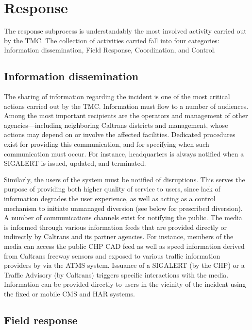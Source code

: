 \documentclass[12pt]{report}
\begin{document}
\section{Response}
\label{sec:response}

The response subprocess is understandably the most involved activity carried out
by the TMC.  The collection of activities carried fall into four categories:
Information dissemination, Field Response, Coordination, and Control.

\subsection{Information dissemination}
\label{sec:inf-dis}

The sharing of information regarding the incident is one of the most critical
actions carried out by the TMC.  Information must flow to a number of audiences.
Among the most important recipients are the operators and management of other
agencies---including neighboring Caltrans districts and management, whose
actions may depend on or involve the affected facilities.  Dedicated procedures
exist for providing this communication, and for specifying when such
communication must occur.  For instance, headquarters is always notified when a
SIGALERT is issued, updated, and terminated.

Similarly, the users of the system must be notified of disruptions.  This serves
the purpose of providing both higher quality of service to users, since lack of
information degrades the user experience, as well as acting as a control
mechanism to initiate unmanaged diversion (see below for prescribed diversion).
A number of communications channels exist for notifying the public.  The media
is informed through various information feeds that are provided directly or
indirectly by Caltrans and its partner agencies.  For instance, members of the
media can access the public CHP CAD feed as well as speed information derived
from Caltrans freeway sensors and exposed to various traffic information
providers by via the ATMS system.  Issuance of a SIGALERT (by the CHP) or a
Traffic Advisory (by Caltrans) triggers specific interactions with the media.
Information can be provided directly to users in the vicinity of the incident
using the fixed or mobile CMS and HAR systems.

\subsection{Field response}
\label{sec:field-response}
\end{document}

